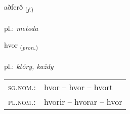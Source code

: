 \documentclass[frontgrid, backgrid]{flacards}\usepackage[]{graphicx}\usepackage[]{xcolor}
\begin{document}
\renewcommand{\blhead}{\vskip5pt {\small\bfseries\footnotesize Nafnorð | Noun }}
\renewcommand{\bcfoot}{\vskip5pt \hspace{2pt}{\small\bfseries\footnotesize 1K}}


{aðferð \small{\textsubscript{(\textit{f.})}} \\[1ex] %
\textphonetic{[aðfɛrð]} \\
pl.: \emph{metoda} \\  [2ex]
\renewcommand*{\arraystretch}{0.8}
}

\renewcommand{\flhead}{\vskip5pt \fboxsep=0pt {\small\bfseries\footnotesize Fornafn | Pronoun}}
\renewcommand{\fcfoot}{\vskip5pt \fboxsep=0pt \hspace{2pt}{\small\bfseries\footnotesize 1K}}

\renewcommand{\blhead}{\vskip5pt {\small\bfseries\footnotesize Fornafn | Pronoun }}
\renewcommand{\bcfoot}{\vskip5pt \hspace{2pt}{\small\bfseries\footnotesize 1K}}


{hvor \small{\textsubscript{(\textit{pron.})}} \\[1ex] %
\textphonetic{[kʰvɔːr]} \\
pl.: \emph{który, każdy} \\  [2ex]
\renewcommand*{\arraystretch}{0.8}
\begin{tabular}{ll}
\textsc{sg.nom.}: & hvor  --  hvor -- hvort \\ 
\textsc{pl.nom.}: & hvorir -- hvorar -- hvor
\end{tabular}
}

\renewcommand{\flhead}{\vskip5pt \fboxsep=0pt {\small\bfseries\footnotesize Nafnorð | Noun}}
\renewcommand{\fcfoot}{\vskip5pt \fboxsep=0pt \hspace{2pt}{\small\bfseries\footnotesize 1K}}
\end{document}
